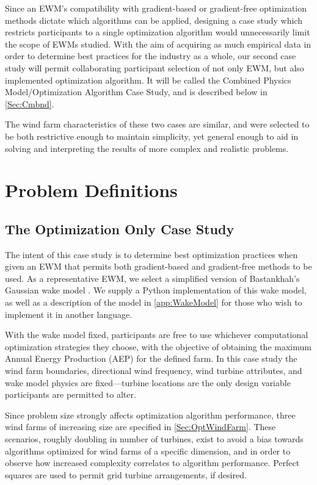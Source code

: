 \documentclass[12pt]{article}
\begin{document}
    Since an EWM's compatibility with gradient-based or gradient-free optimization methods dictate which algorithms can be applied, designing a case study which restricts participants to a single optimization algorithm would unnecessarily limit the scope of EWMs studied. With the aim of acquiring as much empirical data in order to determine best practices for the industry as a whole, our second case study will permit collaborating participant selection of not only EWM, but also implemented optimization algorithm. It will be called the Combined Physics Model/Optimization Algorithm Case Study, and is described below in \cref{Sec:Cmbnd}.
    
    The wind farm characteristics of these two cases are similar, and were selected to be both restrictive enough to maintain simplicity, yet general enough to aid in solving and interpreting the results of more complex and realistic problems.

\section{Problem Definitions}
\subsection{The Optimization Only Case Study}\label{Sec:OptOnly}
    The intent of this case study is to determine best optimization practices when given an EWM that permits both gradient-based and gradient-free methods to be used. As a representative EWM, we select a simplified version of Bastankhah's Gaussian wake model \cite{Thomas2018,Bastankhah2014,Bastankhah2016}. We supply a Python implementation of this wake model, as well as a description of the model in \cref{app:WakeModel} for those who wish to implement it in another language.

    With the wake model fixed, participants are free to use whichever computational optimization strategies they choose, with the objective of obtaining the maximum Annual Energy Production (AEP) for the defined farm. In this case study the wind farm boundaries, directional wind frequency, wind turbine attributes, and wake model physics are fixed---turbine locations are the only design variable participants are permitted to alter.
    
    Since problem size strongly affects optimization algorithm performance, three wind farms of increasing size are specified in \cref{Sec:OptWindFarm}. These scenarios, roughly doubling in number of turbines, exist to avoid a bias towards algorithms optimized for wind farms of a specific dimension, and in order to observe how increased complexity correlates to algorithm performance. Perfect squares are used to permit grid turbine arrangements, if desired.
    
\end{document}
